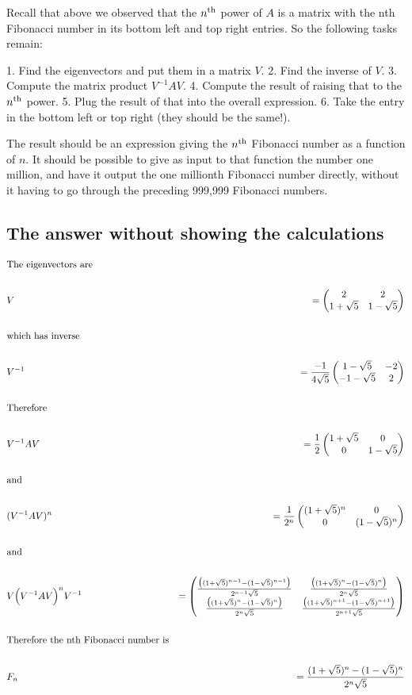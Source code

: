 Recall that above we observed that the $n^{\text{th}}$ power of $A$ is a matrix with the
nth Fibonacci number in its bottom left and top right entries. So the following
tasks remain:

1. Find the eigenvectors and put them in a matrix $V$.
2. Find the inverse of $V$.
3. Compute the matrix product $V^{-1}AV$.
4. Compute the result of raising that to the $n^{\text{th}}$ power.
5. Plug the result of that into the overall expression.
6. Take the entry in the bottom left or top right (they should be the same!).

The result should be an expression giving the $n^{\text{th}}$ Fibonacci number as a
function of $n$. It should be possible to give as input to that function the
number one million, and have it output the one millionth Fibonacci number
directly, without it having to go through the preceding 999,999 Fibonacci
numbers.


\subsection*{The answer without showing the calculations}

\begin{align*}
&\text{The eigenvectors are}
\\\\
&V &= \begin{pmatrix}2           & 2          \\1 + \sqrt 5 & 1 - \sqrt 5\\ \end{pmatrix}
\\\\
&\text{which has inverse}
\\\\
&V^{-1} &= \frac{-1}{4\sqrt 5} \begin{pmatrix}1 - \sqrt 5  & -2\\-1 - \sqrt 5 & 2\\ \end{pmatrix}
\\\\
&\text{Therefore}
\\\\
&V^{-1}AV &= \frac{1}{2} \begin{pmatrix}1 + \sqrt 5 & 0          \\0           & 1 - \sqrt 5\\ \end{pmatrix}
\\\\
&\text{and}
\\\\
&(V^{-1}AV)^n &= \frac{1}{2^n} \begin{pmatrix}(1 + \sqrt 5)^n & 0          \\0                 & (1 - \sqrt 5)^n\\ \end{pmatrix}
\\\\
&\text{and}
\\\\
&V \Big(V^{-1}AV\Big)^n V^{-1} &=
\begin{pmatrix}\frac{\big((1 + \sqrt 5)^{n-1} - (1 - \sqrt 5)^{n-1}\big)}{2^{n-1}\sqrt 5} & \frac{\big((1 + \sqrt 5)^n     - (1 - \sqrt 5)^n    \big)}{2^n    \sqrt 5}\\\frac{\big((1 + \sqrt 5)^n     - (1 - \sqrt 5)^n    \big)}{2^n    \sqrt 5} & \frac{\big((1 + \sqrt 5)^{n+1} - (1 - \sqrt 5)^{n+1}\big)}{2^{n+1}\sqrt 5}\\ \end{pmatrix}
\\\\
&\text{Therefore the nth Fibonacci number is}
\\\\
&F_n &= \frac{(1 + \sqrt 5)^n     - (1 - \sqrt 5)^n}
             {2^n    \sqrt 5}
\end{align*}

